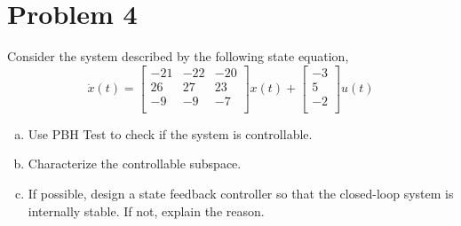 \documentclass{article}
\begin{document}
\newpage
\section*{Problem 4}
Consider the system described by the following state equation,
$$ \dot{x}(t) =
\begin{bmatrix}
-21 & -22 & -20 \\
26 & 27 & 23 \\
-9 & -9 & -7 \\
\end{bmatrix}
x(t) +
\begin{bmatrix}
-3 \\
5 \\
-2 \\
\end{bmatrix}
u(t)
$$

\begin{enumerate}[(a)]
\item Use PBH Test to check if the system is controllable.
\newline
\newline

\item Characterize the controllable subspace.
\newline
\newline

\item If possible, design a state feedback controller so that the closed-loop system is internally stable.
If not, explain the reason.
\newline
\newline

\end{enumerate}
\end{document}
